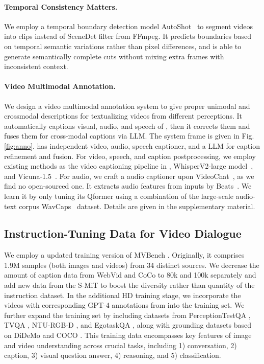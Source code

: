 \paragraph{Temporal Consistency Matters.} We employ a temporal boundary detection model AutoShot~\cite{zhu2023autoshot} to segment videos into clips instead of SceneDet filter from FFmpeg. It predicts  boundaries based on temporal semantic variations rather than pixel differences, and is able to generate semantically complete cuts without mixing extra frames with inconsistent context. 

\paragraph{Video Multimodal Annotation.} We design a video multimodal annotation system {\annoname} to give proper unimodal and crossmodal descriptions for textualizing videos from different perceptions. It automatically captions visual, audio, and speech of {\dataname}, then it corrects them and fuses them for cross-modal captions via LLM. The system frame is given in Fig. \ref{fig:anno}. {\annoname} has independent video, audio, speech captioner, and a LLM for caption refinement and fusion. For video, speech, and caption postprocessing, we employ existing methods as the video captioning pipeline in \cite{wang2023internvid}, WhisperV2-large model~\cite{whisper}, and Vicuna-1.5~\cite{vicuna}. For audio, we craft a audio captioner upon VideoChat~\cite{li2023videochat}, as we find no open-sourced one. It extracts audio features from inputs by Beats~\cite{beats}. We learn it by only tuning its Qformer using a combination of the large-scale audio-text corpus WavCaps~\cite{mei2023wavcaps} dataset. Details are given in the supplementary material. 

\subsection{Instruction-Tuning Data for Video Dialogue}
We employ a updated training version of MVBench \cite{li2023mvbench}. Originally, it comprises 1.9M samples (both images and videos) from 34 distinct sources. We decrease the amount of caption data from WebVid and CoCo to 80k and 100k separately and add new data from the S-MiT to boost the diversity rather than quantity of the instruction dataset. In the additional HD training stage, we incorporate the videos with corresponding GPT-4 annotations from \cite{chen2024sharegpt4video} into the training set. We further expand the training set by including datasets from PerceptionTestQA \cite{perceptiontest}, TVQA \cite{tvqa}, NTU-RGB-D \cite{ntu_rgbd}, and EgotaskQA \cite{ego4d}, along with grounding datasets based on DiDeMo \cite{didemo} and COCO \cite{coco}.
This training data encompasses key features of image and video understanding across crucial tasks, including 1) conversation, 2) caption, 3) visual question answer, 4) reasoning, and 5) classification. 

